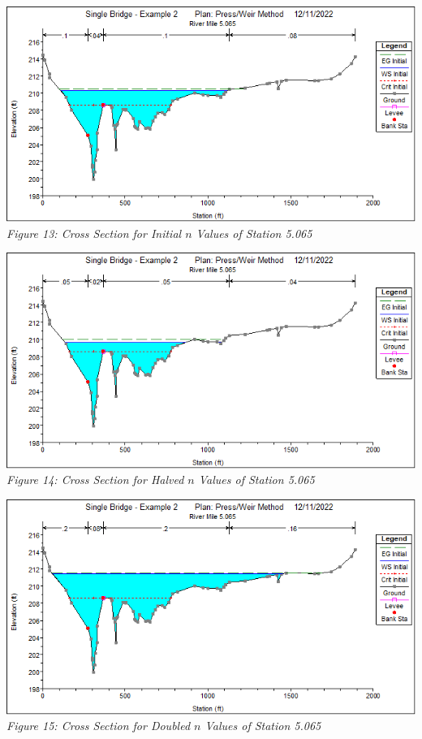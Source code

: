 \begin{center}
\newpage\begin{center}
    \includegraphics[scale=0.7, frame]{fig13.png}
    \\\emph{Figure 13: Cross Section for Initial $n$ Values of Station 5.065}\\
    \vspace{5mm}
    \includegraphics[scale=0.7, frame]{fig14.png}
    \\\emph{Figure 14: Cross Section for Halved $n$ Values of Station 5.065}\\
    \vspace{5mm}
    \includegraphics[scale=0.7, frame]{fig15.png}
    \\\emph{Figure 15: Cross Section for Doubled $n$ Values of Station 5.065}\\
\end{center}\newpage

\end{center}
